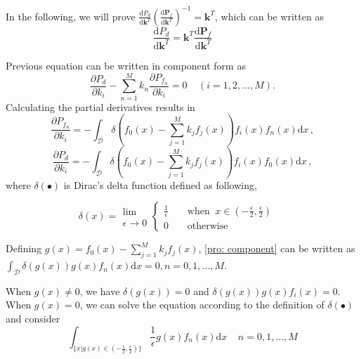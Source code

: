 \documentclass[12pt,journal,a4paper,twoside,onecolumn]{IEEEtran}
\begin{document}
\begin{spacing}{2.5}
In the following, we will prove $ \frac{\mathrm{d}P_d}{\mathrm{d}\mathbf{k}^T}(
\frac{\mathrm{d}\mathbf{P}_f}{\mathrm{d}\mathbf{k}^T}
)^{-1} = \mathbf{k}^T
$, which can be written as
\begin{equation}
\label{pro: vec}
\frac{\mathrm{d}P_d}{\mathrm{d}\mathbf{k}^T} = \mathbf{k}^T \frac{\mathrm{d}\mathbf{P}_f}{\mathrm{d}\mathbf{k}^T}
\end{equation}

Previous equation can be written in component form as
\begin{equation}
\label{pro: component}
\frac{\partial P_d}{\partial k_i} - \sum_{n=1}^{M}k_n\frac{\partial P_{f_n}}{\partial k_i} = 0 \;\;\;\;(i=1, 2, ..., M).
\end{equation}
Calculating the  partial derivatives results in
\begin{equation}
\label{pro: Pf par k}
\frac{\partial P_{f_n}}{ \partial k_i} = - \int_{\mathcal{D}}\delta (f_0(x) - \sum_{j=1}^{M}k_jf_j(x))f_i(x)f_n(x) \mathrm{d}x\,,
\end{equation}
\label{pro: Pd par k}
\begin{equation}\frac{\partial P_d}{ \partial k_i} = - \int_{\mathcal{D}}\delta (f_0(x) - \sum_{j=1}^{M}k_jf_j(x))f_i(x)f_0(x) \mathrm{d}x\,,
\end{equation}
where $\delta(\bullet)$ is Dirac's delta function defined as following,

\begin{equation}
\label{pro: delta}
\delta(x) = \substack{\lim \\ \epsilon \rightarrow 0} \begin{cases}
\frac{1}{\epsilon}\;\;\;\;&\text{when} \;\;x \in (-\frac{\epsilon}{2}, \frac{\epsilon}{2})\\
0\;\;\;\;&\text{otherwise}
\end{cases} \;\;\;\;
\end{equation}

Defining $g(x) = f_0(x) - \sum_{j=1}^{M} k_jf_j(x)$, \eqref{pro: component} can be written as $\int_{\mathcal{D}}\delta(g(x))g(x)f_n(x)\mathrm{d}x = 0, n = 0, 1, ..., M$.

When $g(x) \neq 0$, we have $\delta(g(x)) = 0$ and $\delta(g(x))g(x)f_i(x) = 0$.   When  $g(x) = 0$, we can solve the equation according to the definition of $\delta(\bullet)$ and consider
\begin{equation}
\label{pro: important}
\int_{\{x|g(x)\in (-\frac{\epsilon}{2}, \frac{\epsilon}{2})\}} \frac{1}{\epsilon} g(x)f_n(x) \mathrm{d}x\;\;\;\;n=0, 1, ..., M
\end{equation}


\end{spacing}
\end{document}
